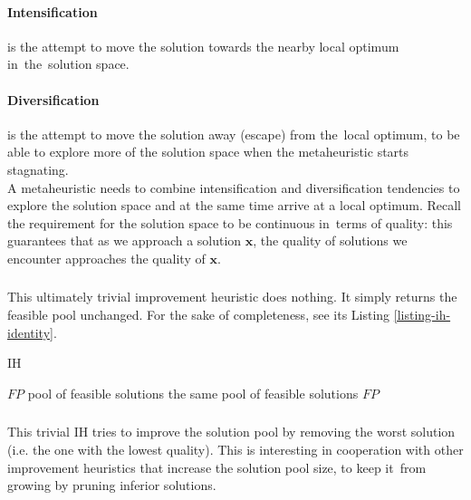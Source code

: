 \paragraph{Intensification}

is the attempt to move the solution towards the nearby local optimum in~the~solution space.

\paragraph{Diversification}

is the attempt to move the solution away (escape) from the~local optimum, to be able to explore more of the solution space when the metaheuristic starts stagnating.\\

A metaheuristic needs to combine intensification and diversification tendencies to explore the solution space and at the same time arrive at a local optimum. Recall the requirement for the solution space to be continuous in~terms of quality: this guarantees that as we approach a solution $\mathbf{x}$, the quality of solutions we encounter approaches the quality of $\mathbf{x}$.

\subsubsection{}

This ultimately trivial improvement heuristic does nothing. It simply returns the feasible pool unchanged. For the sake of completeness, see its Listing \ref{listing-ih-identity}.

\begin{algorithm}
\caption{ IH}
\label{listing-ih-identity}
\begin{algorithmic}
\REQUIRE $FP$ pool of feasible solutions
\ENSURE the same pool of feasible solutions
\RETURN $FP$
\end{algorithmic}
\end{algorithm}

\subsubsection{}

This trivial IH tries to improve the solution pool by removing the worst solution (i.e. the one with the lowest quality). This is interesting in cooperation with other improvement heuristics that increase the solution pool size, to keep it~from growing by pruning inferior solutions.

